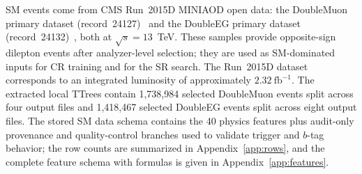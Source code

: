 \documentclass[11pt,a4paper,twocolumn]{article}
\begin{document}
SM events come from CMS Run~2015D MINIAOD open data: the DoubleMuon primary dataset
(record~24127)~\cite{CERNOpenDataDoubleMuon} and the DoubleEG primary dataset
(record~24132)~\cite{CERNOpenDataDoubleEG}, both at $\sqrt{s}=13$~TeV.
These samples provide opposite-sign dilepton events after analyzer-level selection;
they are used as SM-dominated inputs for CR training and for the SR search.
The Run~2015D dataset corresponds to an integrated luminosity of approximately
$2.32~\mathrm{fb}^{-1}$.
The extracted local TTrees contain 1,738,984 selected DoubleMuon events split across four
output files and 1,418,467 selected DoubleEG events split across eight output files.
The stored SM data schema contains the 40 physics features plus audit-only provenance and
quality-control branches used to validate trigger and $b$-tag behavior; the row counts are
summarized in Appendix~\ref{app:rows}, and the complete feature schema with formulas is
given in Appendix~\ref{app:features}.
\end{document}
